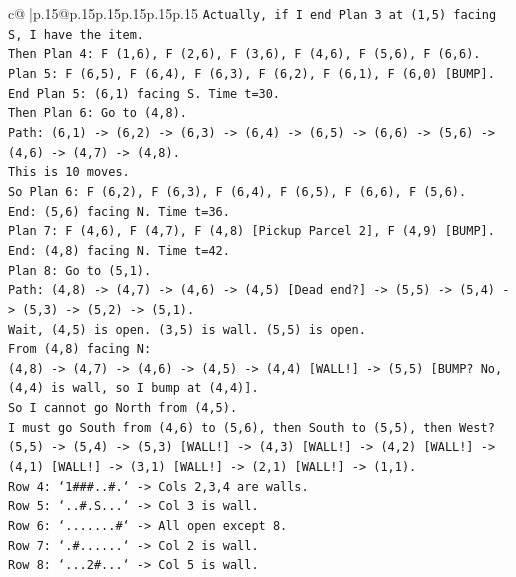 \documentclass{article}
\begin{document}
{\begin{supertabular}{c@{$\;$}|p{.15\linewidth}@{}p{.15\linewidth}p{.15\linewidth}p{.15\linewidth}p{.15\linewidth}p{.15\linewidth}}
{{{\texttt{Actually, if I end Plan 3 at (1,5) facing S, I have the item.} \\
\texttt{Then Plan 4: F (1,6), F (2,6), F (3,6), F (4,6), F (5,6), F (6,6).} \\
\texttt{Plan 5: F (6,5), F (6,4), F (6,3), F (6,2), F (6,1), F (6,0) {[}BUMP{]}.} \\
\texttt{End Plan 5: (6,1) facing S. Time t=30.} \\
\texttt{Then Plan 6: Go to (4,8).} \\
\texttt{Path: (6,1) {-}> (6,2) {-}> (6,3) {-}> (6,4) {-}> (6,5) {-}> (6,6) {-}> (5,6) {-}> (4,6) {-}> (4,7) {-}> (4,8).} \\
\texttt{This is 10 moves.} \\
\texttt{So Plan 6: F (6,2), F (6,3), F (6,4), F (6,5), F (6,6), F (5,6).} \\
\texttt{End: (5,6) facing N. Time t=36.} \\
\texttt{Plan 7: F (4,6), F (4,7), F (4,8) {[}Pickup Parcel 2{]}, F (4,9) {[}BUMP{]}.} \\
\texttt{End: (4,8) facing N. Time t=42.} \\
\texttt{Plan 8: Go to (5,1).} \\
\texttt{Path: (4,8) {-}> (4,7) {-}> (4,6) {-}> (4,5) {[}Dead end?{]} {-}> (5,5) {-}> (5,4) {-}> (5,3) {-}> (5,2) {-}> (5,1).} \\
\texttt{Wait, (4,5) is open. (3,5) is wall. (5,5) is open.} \\
\texttt{From (4,8) facing N:} \\
\texttt{(4,8) {-}> (4,7) {-}> (4,6) {-}> (4,5) {-}> (4,4) {[}WALL!{]} {-}> (5,5) {[}BUMP? No, (4,4) is wall, so I bump at (4,4){]}.} \\
\texttt{So I cannot go North from (4,5).} \\
\texttt{I must go South from (4,6) to (5,6), then South to (5,5), then West?} \\
\texttt{(5,5) {-}> (5,4) {-}> (5,3) {[}WALL!{]} {-}> (4,3) {[}WALL!{]} {-}> (4,2) {[}WALL!{]} {-}> (4,1) {[}WALL!{]} {-}> (3,1) {[}WALL!{]} {-}> (2,1) {[}WALL!{]} {-}> (1,1).} \\
\texttt{Row 4: `1\#\#\#..\#.` {-}> Cols 2,3,4 are walls.} \\
\texttt{Row 5: `..\#.S...` {-}> Col 3 is wall.} \\
\texttt{Row 6: `.......\#` {-}> All open except 8.} \\
\texttt{Row 7: `.\#......` {-}> Col 2 is wall.} \\
\texttt{Row 8: `...2\#...` {-}> Col 5 is wall.} \\
}}}
\end{supertabular}}
\end{document}
